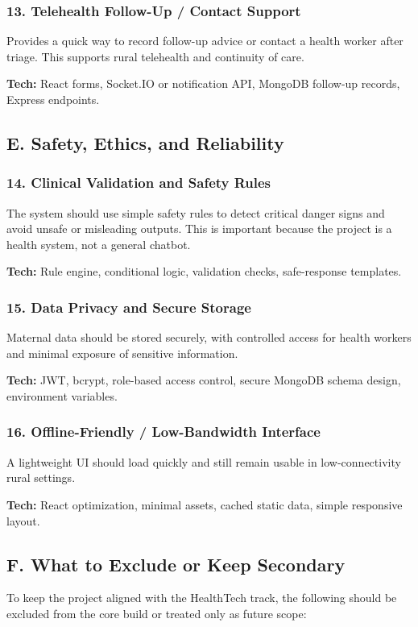 \documentclass[11pt]{article}
\begin{document}
\subsubsection{13. Telehealth Follow-Up / Contact Support}
Provides a quick way to record follow-up advice or contact a health worker after triage. This supports rural telehealth and continuity of care.

\textbf{Tech:} React forms, Socket.IO or notification API, MongoDB follow-up records, Express endpoints.

\subsection{E. Safety, Ethics, and Reliability}

\subsubsection{14. Clinical Validation and Safety Rules}
The system should use simple safety rules to detect critical danger signs and avoid unsafe or misleading outputs. This is important because the project is a health system, not a general chatbot.

\textbf{Tech:} Rule engine, conditional logic, validation checks, safe-response templates.

\subsubsection{15. Data Privacy and Secure Storage}
Maternal data should be stored securely, with controlled access for health workers and minimal exposure of sensitive information.

\textbf{Tech:} JWT, bcrypt, role-based access control, secure MongoDB schema design, environment variables.

\subsubsection{16. Offline-Friendly / Low-Bandwidth Interface}
A lightweight UI should load quickly and still remain usable in low-connectivity rural settings.

\textbf{Tech:} React optimization, minimal assets, cached static data, simple responsive layout.

\subsection{F. What to Exclude or Keep Secondary}
To keep the project aligned with the HealthTech track, the following should be excluded from the core build or treated only as future scope:
\end{document}
